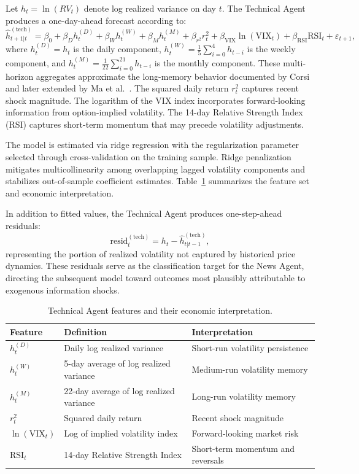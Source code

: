 \documentclass[review]{elsarticle}
\begin{document}
Let $h_t = \ln(RV_t)$ denote log realized variance on day $t$. The Technical Agent produces a one-day-ahead forecast according to:
\begin{equation}\label{eq:tech-agent}
\widehat{h}_{t+1|t}^{(\text{tech})}
= \beta_0
+ \beta_D h_t^{(D)}
+ \beta_W h_t^{(W)}
+ \beta_M h_t^{(M)}
+ \beta_{r^2} r_t^2
+ \beta_{\text{VIX}} \ln(\text{VIX}_t)
+ \beta_{\text{RSI}} \text{RSI}_t
+ \varepsilon_{t+1},
\end{equation}
where $h_t^{(D)} = h_t$ is the daily component, $h_t^{(W)} = \frac{1}{5}\sum_{i=0}^{4} h_{t-i}$ is the weekly component, and $h_t^{(M)} = \frac{1}{22}\sum_{i=0}^{21} h_{t-i}$ is the monthly component. These multi-horizon aggregates approximate the long-memory behavior documented by Corsi \cite{corsi2009} and later extended by Ma et al.~\cite{ma2019}. The squared daily return $r_t^2$ captures recent shock magnitude. The logarithm of the VIX index incorporates forward-looking information from option-implied volatility. The 14-day Relative Strength Index (RSI) captures short-term momentum that may precede volatility adjustments.

The model is estimated via ridge regression with the regularization parameter selected through cross-validation on the training sample. Ridge penalization mitigates multicollinearity among overlapping lagged volatility components and stabilizes out-of-sample coefficient estimates. Table~\ref{tab:technical-features} summarizes the feature set and economic interpretation.

In addition to fitted values, the Technical Agent produces one-step-ahead residuals:
\[
\text{resid}_{t}^{(\text{tech})} = h_t - \widehat{h}_{t|t-1}^{(\text{tech})},
\]
representing the portion of realized volatility not captured by historical price dynamics. These residuals serve as the classification target for the News Agent, directing the subsequent model toward outcomes most plausibly attributable to exogenous information shocks.

\begin{table}[t]
\centering
\caption{Technical Agent features and their economic interpretation.}
\label{tab:technical-features}
\begin{tabular}{lll}
\hline
Feature & Definition & Interpretation \\ \hline
$h_t^{(D)}$ & Daily log realized variance & Short-run volatility persistence \\
$h_t^{(W)}$ & 5-day average of log realized variance & Medium-run volatility memory \\
$h_t^{(M)}$ & 22-day average of log realized variance & Long-run volatility memory \\
$r_t^2$ & Squared daily return & Recent shock magnitude \\
$\ln(\text{VIX}_t)$ & Log of implied volatility index & Forward-looking market risk \\
$\text{RSI}_t$ & 14-day Relative Strength Index & Short-term momentum and reversals \\
\hline
\end{tabular}
\end{table}
\end{document}
